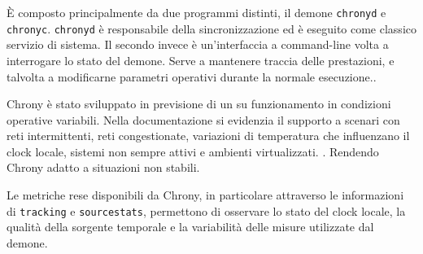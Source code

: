 È composto principalmente da due programmi distinti, il demone \texttt{chronyd} e
\texttt{chronyc}. \texttt{chronyd} è responsabile della sincronizzazione ed è eseguito come classico servizio di sistema.
Il secondo invece è un'interfaccia a command-line volta a interrogare lo stato del demone. Serve a mantenere traccia delle prestazioni, e 
talvolta a modificarne parametri operativi durante la normale esecuzione.\cite{ChronyDocumentation}.

Chrony è stato sviluppato in previsione di un su funzionamento in condizioni operative variabili.
Nella documentazione si evidenzia il supporto a scenari con reti intermittenti, reti congestionate, 
variazioni di temperatura che influenzano il clock locale, sistemi non sempre attivi e ambienti virtualizzati. \cite{ChronyDocumentation}.
Rendendo Chrony adatto a situazioni non stabili.

\begin{sloppypar}
Le metriche rese disponibili da Chrony, in particolare attraverso le
informazioni di \texttt{tracking} e \texttt{sourcestats}, permettono di osservare
lo stato del clock locale, la qualità della sorgente temporale e la variabilità
delle misure utilizzate dal demone.
\end{sloppypar}


